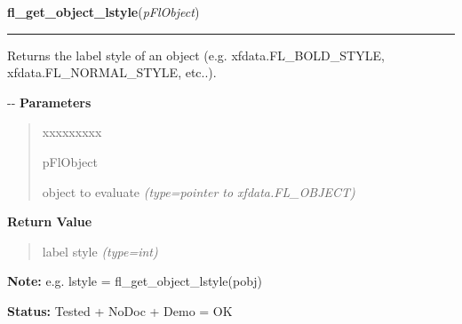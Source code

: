 \hspace{.8\funcindent}\begin{boxedminipage}{\funcwidth}

    \raggedright \textbf{fl\_get\_object\_lstyle}(\textit{pFlObject})

    \vspace{-1.5ex}

    \rule{\textwidth}{0.5\fboxrule}
\setlength{\parskip}{2ex}

Returns the label style of an object (e.g. xfdata.FL\_BOLD\_STYLE,
xfdata.FL\_NORMAL\_STYLE, etc..).

-{}-
\setlength{\parskip}{1ex}
      \textbf{Parameters}
      \vspace{-1ex}

      \begin{quote}
        \begin{Ventry}{xxxxxxxxx}

          \item[pFlObject]


object to evaluate
            {\it (type=pointer to xfdata.FL\_OBJECT)}

        \end{Ventry}

      \end{quote}

      \textbf{Return Value}
    \vspace{-1ex}

      \begin{quote}

label style
      {\it (type=int)}

      \end{quote}

\textbf{Note:} 
e.g. lstyle = fl\_get\_object\_lstyle(pobj)


\textbf{Status:} 
Tested + NoDoc + Demo = OK


    \end{boxedminipage}

    \label{xformslib:flbasic:fl_set_object_lcol}

    \vspace{0.5ex}

